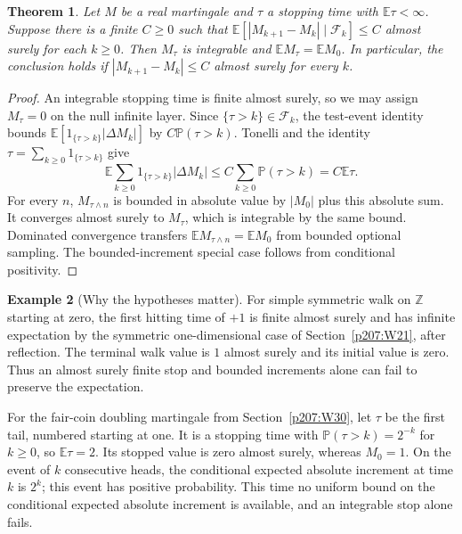 \documentclass[11pt,oneside,openany]{book}
\theoremstyle{plain}
\newtheorem{theorem}{Theorem}[chapter]
\theoremstyle{definition}
\newtheorem{example}[theorem]{Example}
\theoremstyle{remark}
\begin{document}
\begin{theorem}
Let \(M\) be a real martingale and \(\tau\) a stopping time
with \(\mathbb E\tau<\infty\). Suppose there is a finite \(C\ge0\)
such that
\(\mathbb E[|M_{k+1}-M_k|\mid\mathcal F_k]\le C\)
almost surely for each \(k\ge0\).
Then \(M_\tau\) is integrable and
\(\mathbb E M_\tau=\mathbb E M_0\).
In particular, the conclusion holds if
\(|M_{k+1}-M_k|\le C\) almost surely for every \(k\).
\end{theorem}
\begin{proof}
An integrable stopping time is finite almost surely, so we may
assign \(M_\tau=0\) on the null infinite layer. Since
\(\{\tau>k\}\in\mathcal F_k\), the test-event identity bounds
\(\mathbb E[1_{\{\tau>k\}}|\Delta M_k|]\) by
\(C\mathbb P(\tau>k)\). Tonelli and the identity
\(\tau=\sum_{k\ge0}1_{\{\tau>k\}}\) give
\[
 \mathbb E\sum_{k\ge0}1_{\{\tau>k\}}|\Delta M_k|
     \le C\sum_{k\ge0}\mathbb P(\tau>k)
     =C\mathbb E\tau.
\]
For every \(n\), \(M_{\tau\wedge n}\) is bounded in absolute
value by \(|M_0|\) plus this absolute sum. It converges almost
surely to \(M_\tau\), which is integrable by the same bound.
Dominated convergence transfers
\(\mathbb E M_{\tau\wedge n}=\mathbb E M_0\) from bounded optional
sampling. The bounded-increment special case follows from
conditional positivity.
\end{proof}

\begin{example}[Why the hypotheses matter]
For simple symmetric walk on \(\mathbb Z\) starting at zero,
the first hitting time of \(+1\) is finite almost surely and has
infinite expectation by the symmetric one-dimensional case of
Section~\ref{p207:W21}, after reflection. The terminal walk value
is \(1\) almost surely and its initial value is zero.
Thus an almost surely finite stop and bounded increments alone
can fail to preserve the expectation.

For the fair-coin doubling martingale from
Section~\ref{p207:W30}, let \(\tau\) be the first tail, numbered
starting at one. It is a stopping time with
\(\mathbb P(\tau>k)=2^{-k}\) for \(k\ge0\), so \(\mathbb E\tau=2\).
Its stopped value is zero almost surely, whereas \(M_0=1\).
On the event of \(k\) consecutive heads, the conditional expected
absolute increment at time \(k\) is \(2^k\); this event has
positive probability. This time no uniform bound on the
conditional expected absolute increment is available, and an
integrable stop alone fails.
\end{example}
\end{document}

